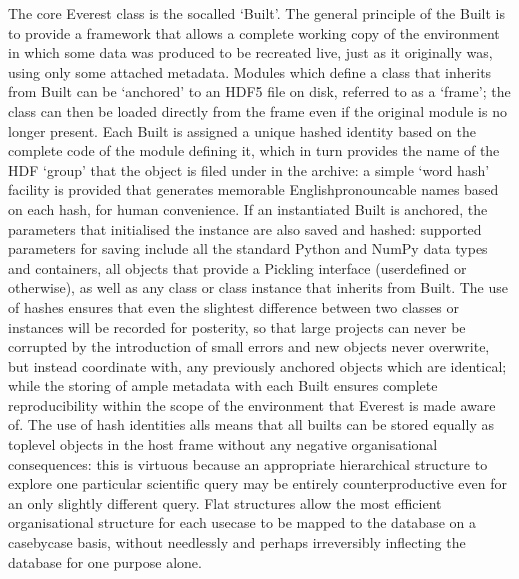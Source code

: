 \documentclass[letterpaper,10pt,english]{jupyterBook}
\begin{document}
\sphinxAtStartPar
The core Everest class is the so\sphinxhyphen{}called ‘Built’. The general principle of the Built is to provide a framework that allows a complete working copy of the environment in which some data was produced to be recreated live, just as it originally was, using only some attached metadata. Modules which define a class that inherits from Built can be ‘anchored’ to an HDF5 file on disk, referred to as a ‘frame’; the class can then be loaded directly from the frame even if the original module is no longer present. Each Built is assigned a unique hashed identity based on the complete code of the module defining it, which in turn provides the name of the HDF ‘group’ that the object is filed under in the archive: a simple ‘word hash’ facility is provided that generates memorable English\sphinxhyphen{}pronouncable names based on each hash, for human convenience. If an instantiated Built is anchored, the parameters that initialised the instance are also saved and hashed: supported parameters for saving include all the standard Python and NumPy data types and containers, all objects that provide a Pickling interface (user\sphinxhyphen{}defined or otherwise), as well as any class or class instance that inherits from Built. The use of hashes ensures that even the slightest difference between two classes or instances will be recorded for posterity, so that large projects can never be corrupted by the introduction of small errors and new objects never overwrite, but instead coordinate with, any previously anchored objects which are identical; while the storing of ample metadata with each Built ensures complete reproducibility within the scope of the environment that Everest is made aware of. The use of hash identities alls means that all builts can be stored equally as top\sphinxhyphen{}level objects in the host frame without any negative organisational consequences: this is virtuous because an appropriate hierarchical structure to explore one particular scientific query may be entirely counterproductive even for an only slightly different query. Flat structures allow the most efficient organisational structure for each use\sphinxhyphen{}case to be mapped to the database on a case\sphinxhyphen{}by\sphinxhyphen{}case basis, without needlessly and perhaps irreversibly inflecting the database for one purpose alone.
\end{document}
